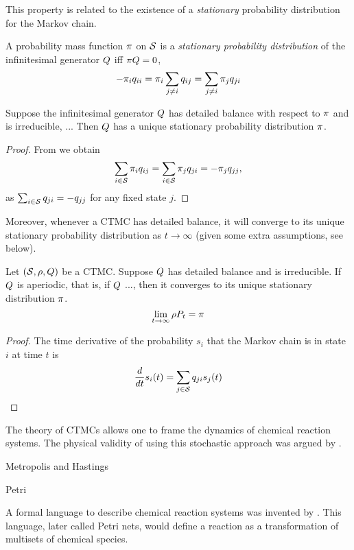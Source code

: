 This property is related to the existence of a
\emph{stationary} probability distribution for the Markov chain.

\begin{definition}
  A probability mass function $\pi$ on $\mathcal{S}$ is
  a \emph{stationary probability distribution} of
  the infinitesimal generator $Q$ iff $\pi Q = 0$, \ie
  \[ -\pi_i q_{ii} = \pi_i \sum_{j \neq i} q_{ij}
                  = \sum_{j \neq i} \pi_j q_{ji} \]
\end{definition}

\begin{lemma}
  Suppose the infinitesimal generator $Q$
  has detailed balance with respect to $\pi$
  and is irreducible, \ie ... %
  Then $Q$ has a unique stationary probability distribution $\pi$.
\end{lemma}
\begin{proof}
  From  we obtain
  \[ \sum_{i \in \mathcal{S}} \pi_i q_{ij} =
     \sum_{i \in \mathcal{S}} \pi_j q_{ji} = -\pi_j q_{jj}, \]
  as $\sum_{i \in \mathcal{S}} q_{ji} = -q_{jj}$ for any fixed state $j$.
\end{proof}

Moreover, whenever a CTMC has detailed balance,
it will converge to its unique stationary probability distribution
as $t \to \infty$ (given some extra assumptions, see below).

\begin{lemma}
  Let $\left(\mathcal{S}, \rho, Q\right)$ be a CTMC.
  Suppose $Q$ has detailed balance and is irreducible.
  If $Q$ is aperiodic, that is,
  if $Q$ ..., %
  then it converges to its unique stationary distribution $\pi$.
  \[ \lim_{t \to \infty} \rho P_t = \pi \]
\end{lemma}
\begin{proof}
  The time derivative of the probability $s_i$ that the Markov chain
  is in state $i$ at time $t$ is
  \[ \frac{d}{dt} s_i(t) = \sum_{j \in \mathcal{S}} q_{ji}s_j(t) \]
\end{proof}

The theory of CTMCs allows one to frame the dynamics of
chemical reaction systems.
The physical validity of using this stochastic approach
was argued by \citet{gillespie76}.

Metropolis and Hastings

Petri

A formal language to describe chemical reaction systems
was invented by \citet{petri}.
This language, later called Petri nets,
would define a reaction as a transformation of
multisets of chemical species.


